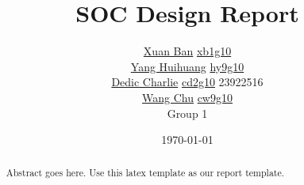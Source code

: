 \documentclass{IEEEtran}			 %
\begin{document}
\title      {SOC Design Report}
\author    {

\texorpdfstring {\href{mailto:xb1g10@ecs.soton.ac.uk}{Xuan Ban}} {Xuan Ban}  
\texorpdfstring {\href{mailto:xb1g10@ecs.soton.ac.uk}{xb1g10}} {xb1g10} \\ 
    {\href{mailto:xb1g10@ecs.soton.ac.uk}{Yang Huihuang}} 
	\texorpdfstring  {\href{mailto:hy9g10@ecs.soton.ac.uk}{hy9g10}} {hy9g10} \\   
    {\href{mailto:xb1g10@ecs.soton.ac.uk}{Dedic Charlie}} 
	\texorpdfstring  {\href{mailto:cd2g11@ecs.soton.ac.uk}{cd2g10}} {cd2g11} {23922516} \\
    {\href{mailto:xb1g10@ecs.soton.ac.uk}{Wang Chu}}             
	\texorpdfstring  {\href{mailto:cd2g10@ecs.soton.ac.uk}{cw9g10}} {cw9g10} \\
	Group 1
            }
\date       {\today}

\maketitle

\begin{abstract}
Abstract goes here. Use this latex template as our report template.
\end{abstract}












%


%
%
%
%
%
\end{document}
